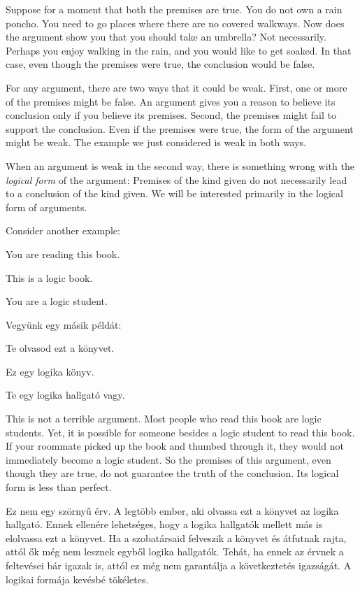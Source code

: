 Suppose for a moment that both the premises are true. You do not own a rain poncho. You need to go places where there are no covered walkways. Now does the argument show you that you should take an umbrella? Not necessarily. Perhaps you enjoy walking in the rain, and you would like to get soaked. In that case, even though the premises were true, the conclusion would be false.

For any argument, there are two ways that it could be weak. First, one or more of the premises might be false. An argument gives you a reason to believe its conclusion only if you believe its premises. Second, the premises might fail to support the conclusion. Even if the premises were true, the form of the argument might be weak. The example we just considered is weak in both ways.

When an argument is weak in the second way, there is something wrong with the \emph{logical form} of the argument: Premises of the kind given do not necessarily lead to a conclusion of the kind given. We will be interested primarily in the logical form of arguments.



Consider another example:
\begin{earg}
\item[] You are reading this book.
\item[] This is a logic book.
\item[\therefore] You are a logic student.
\end{earg}

Vegyünk egy másik példát:
\begin{earg}
\item[] Te olvasod ezt a könyvet.
\item[] Ez egy logika könyv.
\item[\therefore] Te egy logika hallgató vagy.
\end{earg}

This is not a terrible argument. Most people who read this book are logic students. Yet, it is possible for someone besides a logic student to read this book. If your roommate picked up the book and thumbed through it, they would not immediately become a logic student. So the premises of this argument, even though they are true, do not guarantee the truth of the conclusion. Its logical form is less than perfect.

Ez nem egy szörnyű érv. A legtöbb ember, aki olvassa ezt a könyvet az logika hallgató. Ennek ellenére lehetséges, hogy a logika hallgatók mellett más is elolvassa ezt a könyvet. Ha a szobatársaid felveszik a könyvet és átfutnak rajta, attól ők még nem lesznek egyből logika hallgatók. Tehát, ha ennek az érvnek a feltevései bár igazak is, attól ez még nem garantálja a következtetés igazságát. A logikai formája kevésbé tökéletes.

